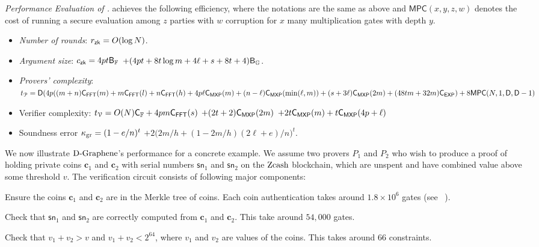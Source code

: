 {\em Performance Evaluation of \dpname.}
\dpname achieves the following efficiency, where the notations are the same as above and $\mathsf{MPC}(x,y,z,w)$ denotes the cost of running a secure evaluation among $z$ parties with $w$ corruption for $x$ many multiplication gates with depth $y$.
\begin{itemize}
	\item {\em Number of rounds}: $r_\mathsf{zk}=O(\log{N})$.
	\item {\em Argument size}: $c_\mathsf{zk}= 4pt\mathsf{B}_\mathbb{F}$
	$+(4pt+8t\log{m}+4\ell+s+8t+4)\mathsf{B}_\mathbb{G}$.
	\item {\em Provers' complexity}: $t_{\mathcal{P}} = \mathsf{D}(4p((m+n)\mathsf{C}_\mathsf{FFT}(m)+m\mathsf{C}_\mathsf{FFT}(l)
	+n\mathsf{C}_\mathsf{FFT}(h) + 4p\ell\mathsf{C}_\mathsf{MXP}(m)
	+(n-\ell)\mathsf{C}_\mathsf{MXP}(\min(\ell,m))
	+(s+3\ell)\mathsf{C}_\mathsf{MXP}(2m)+ (48tm+32m)\mathsf{C}_\mathsf{EXP}) + 8 \mathsf{MPC}(N,1,\mathsf{D}, \mathsf{D}-1)$
	\item {Verifier complexity}:  $t_{\mathcal{V}}=O(N)\mathsf{C}_\mathbb{F} + 4pm\mathsf{C}_\mathsf{FFT}(s)$
	$+(2t+2)\mathsf{C}_\mathsf{MXP}(2m)$
	$+2t\mathsf{C}_\mathsf{MXP}(m)+t\mathsf{C}_\mathsf{MXP}(4p+\ell)$
	\item{Soundness error} $\kappa_{\rm gr} = (1-e/n)^t$
	$+2\big(2m/h+(1-2m/h)(2\ell+e)/n\big)^t$.
\end{itemize}

We now illustrate $\text{D-Graphene}$'s performance for a concrete example. We assume two
provers $P_1$ and $P_2$ who wish to produce a proof of holding private coins
$\bm{c}_1$ and $\bm{c}_2$ with serial
numbers $\mathsf{sn}_1$ and $\mathsf{sn}_2$ on the $\mathrm{Zcash}$ blockchain, which
are unspent and have combined value above some threshold $v$. The verification
circuit consists of following major components:

Ensure the coins $\bm{c}_1$ and $\bm{c}_2$ are in the Merkle tree of
coins. Each coin authentication takes around $1.8\times 10^6$ gates (see
~\cite[Section 5.2.2]{zerocashext}).

Check that $\mathsf{sn}_1$ and $\mathsf{sn}_2$ are correctly computed from $\bm{c}_1$ and $\bm{c}_2$. This take around $54,000$ gates.

Check that $v_1+v_2>v$ and $v_1+v_2 < 2^{64}$, where $v_1$ and $v_2$ are values of the coins. This takes around 66 constraints.

